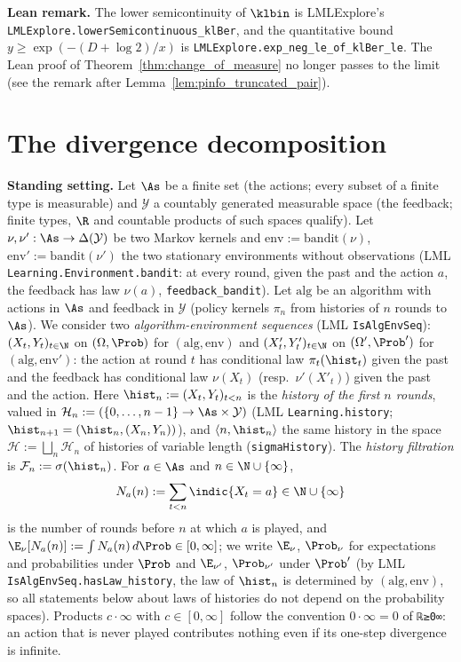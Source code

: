 \textbf{Lean remark.} The lower semicontinuity of $\klbin$ is LMLExplore's
\texttt{LMLExplore.lowerSemicontinuous\_klBer}, and the quantitative bound
$y \ge \exp(-(D + \log 2)/x)$ is \texttt{LMLExplore.exp\_neg\_le\_of\_klBer\_le}. The Lean proof of
Theorem~\ref{thm:change_of_measure} no longer passes to the limit (see the remark after
Lemma~\ref{lem:pinfo_truncated_pair}).

\section{The divergence decomposition}
\label{sec:pinfo_decomposition}

\textbf{Standing setting.} Let $\As$ be a finite set (the actions; every subset of a finite
type is measurable) and $\mathcal Y$ a countably generated measurable space (the feedback;
finite types, $\R$ and countable products of such spaces qualify). Let $\nu, \nu' : \As \to
\Delta(\mathcal Y)$ be two Markov kernels and $\mathrm{env} := \mathrm{bandit}(\nu)$,
$\mathrm{env}' := \mathrm{bandit}(\nu')$ the two stationary environments without
observations (LML \texttt{Learning.Environment.bandit}: at every round, given the past and the
action $a$, the feedback has law $\nu(a)$, \texttt{feedback\_bandit}). Let
$\mathrm{alg}$ be an algorithm with actions in $\As$ and feedback in $\mathcal Y$ (policy
kernels $\pi_n$ from histories of $n$ rounds to $\As$). We consider two
\emph{algorithm-environment sequences} (LML \texttt{IsAlgEnvSeq}): $(X_t, Y_t)_{t \in \N}$ on
$(\Omega, \Prob)$ for $(\mathrm{alg}, \mathrm{env})$ and $(X'_t, Y'_t)_{t\in\N}$ on
$(\Omega', \Prob')$ for $(\mathrm{alg}, \mathrm{env}')$: the action at round $t$ has
conditional law $\pi_t(\hist_t)$ given the past and the feedback has conditional law
$\nu(X_t)$ (resp.\ $\nu'(X'_t)$) given the past and the action. Here
$\hist_n := (X_t, Y_t)_{t < n}$ is the \emph{history of the first $n$ rounds}, valued in
$\mathcal H_n := (\{0, \dots, n-1\} \to \As \times \mathcal Y)$ (LML \texttt{Learning.history};
$\hist_{n+1} = (\hist_n, (X_n, Y_n))$), and $\langle n, \hist_n\rangle$ the same history in the
space $\mathcal H := \bigsqcup_n \mathcal H_n$ of histories of variable length
(\texttt{sigmaHistory}). The \emph{history filtration} is $\mathcal F_n := \sigma(\hist_n)$.
For $a \in \As$ and $n \in \N \cup \{\infty\}$,
\[
  N_a(n) := \sum_{t < n} \indic\{X_t = a\} \in \N \cup \{\infty\}
\]
is the number of rounds before $n$ at which $a$ is played, and $\E_\nu[N_a(n)] := \int N_a(n)\,d\Prob
\in [0, \infty]$; we write $\E_\nu$, $\Prob_\nu$ for expectations and probabilities under
$\Prob$ and $\E_{\nu'}$, $\Prob_{\nu'}$ under $\Prob'$ (by LML
\texttt{IsAlgEnvSeq.hasLaw\_history}, the law of $\hist_n$ is determined by $(\mathrm{alg},
\mathrm{env})$, so all statements below about laws of histories do not depend on the
probability spaces). Products $c \cdot \infty$ with $c \in [0,\infty]$ follow the convention
$0 \cdot \infty = 0$ of \texttt{ℝ≥0∞}: an action that is never played contributes nothing even
if its one-step divergence is infinite.

